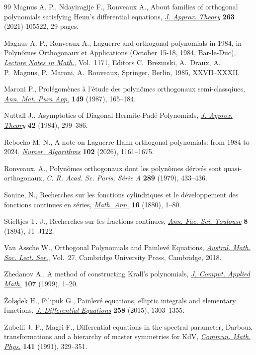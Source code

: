 \documentclass[10pt, reqno]{amsart}
\numberwithin{equation}{section}
\numberwithin{equation}{section}
\begin{document}
\begin{thebibliography}{99}
Magnus A. P., Ndayiragije F., Ronveaux A., 
About families of orthogonal polynomials satisfying Heun's differential equations, 
\href{https://doi.org//10.1016/j.jat.2020.105522}{\textit{J. Approx. Theory}} \textbf{263} (2021) 105522, 29 pages.

Magnus A. P., Ronveaux A., 
Laguerre and orthogonal polynomials in 1984, in Polynômes Orthogonaux et Applications (October 15-18, 1984, Bar-le-Duc), 
\href{https://doi.org//10.1007/BFb0076527}{\textit{Lecture Notes in Math.}}, Vol.~1171, 
Editors C.~Brezinski, A.~Draux, A. P.~Magnus, P.~Maroni, A.~Ronveaux, Springer, Berlin, 1985, XXVII--XXXII.

Maroni P., 
Prolégomènes à l'étude des polynômes orthogonaux semi-classqiues,
\href{https://doi.org/10.1007/BF01773932}{\textit{Ann. Mat. Pura App.}} \textbf{149} (1987), 165--184.

Nuttall J., 
Asymptotics of Diagonal Hermite-Padé Polynomials, 
\href{https://doi.org.//10.1016/0021-9045(84)90036-4} {\textit{J. Approx. Theory}} \textbf{42} (1984), 299--386.

Rebocho M. N., 
A note on Laguerre-Hahn orthogonal polynomials: from 1984 to 2024,
\href{https://doi.org/10.1007/s11075-025-02145-2}{\textit{Numer. Algorithms}} \textbf{102} (2026), 1161--1675.

Ronveaux, A.,
Polynômes orthogonaux dont les polynômes dérivés sont quasi-orthogonaux,
\textit{C. R. Acad. Sc. Paris, Série A} \textbf{289} (1979), 433--436.

Sonine, N.,
Recherches sur les fonctions cylindriques et le développement des fonctions continues en séries, 
\href{https://eudml.org/doc/156875}{\textit{Math. Ann.}} \textbf{16} (1880), 1--80.

Stieltjes T.-J., 
Recherches sur les fractions continues, 
\href{https://doi.org//10.5802/afst.108}{\textit{Ann. Fac. Sci. Toulouse}} \textbf{8} (1894), J1--J122. 

Van Assche W., 
Orthogonal Polynomials and Painlevé Equations, 
\href{https://doi.org.//10.1017/9781108644860}{\textit{Austral. Math. Soc. Lect. Ser.}}, Vol.~27, Cambridge University Press, Cambridge, 2018.

Zhedanov A., 
A method of constructing Krall's polynomials, 
\href{https://doi.org// 10.1016/S0377-0427(99)00070-9} {\textit{J. Comput. Applied Math.}} \textbf{107} (1999), 1--20.

\.Zo\l\c{a}dek H., Filipuk G., 
Painlevé equations, elliptic integrals and elementary functions, 
\href{https://doi.org//10.1016/j.jde.2014.10.018}{\textit{J. Differential Equations}} \textbf{258} (2015), 1303--1355.

Zubelli J. P., Magri F., 
Differential equations in the spectral parameter, Darboux transformations and a hierarchy of master symmetries for KdV, 
\href{https://doi.org//10.1007/BF02101509}{\textit{Commun. Math. Phys.}} \textbf{141} (1991), 329--351.
\end{thebibliography}
\end{document}
